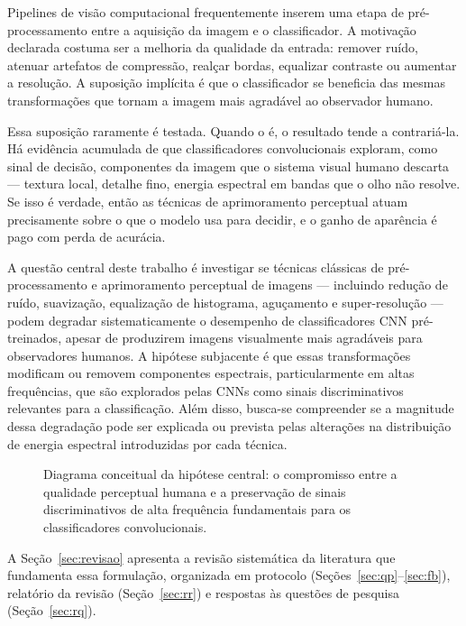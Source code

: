 \documentclass[conference]{IEEEtran}
\begin{document}
Pipelines de visão computacional frequentemente inserem uma etapa de
pré-processamento entre a aquisição da imagem e o classificador. A motivação
declarada costuma ser a melhoria da qualidade da entrada: remover ruído,
atenuar artefatos de compressão, realçar bordas, equalizar contraste ou
aumentar a resolução. A suposição implícita é que o classificador se beneficia
das mesmas transformações que tornam a imagem mais agradável ao observador
humano.

Essa suposição raramente é testada. Quando o é, o resultado tende a
contrariá-la. Há evidência acumulada de que classificadores convolucionais
exploram, como sinal de decisão, componentes da imagem que o sistema visual
humano descarta --- textura local, detalhe fino, energia espectral em bandas
que o olho não resolve. Se isso é verdade, então as técnicas de aprimoramento
perceptual atuam precisamente sobre o que o modelo usa para decidir, e o ganho
de aparência é pago com perda de acurácia.

A questão central deste trabalho é investigar se técnicas clássicas de
pré-processamento e aprimoramento perceptual de imagens --- incluindo redução
de ruído, suavização, equalização de histograma, aguçamento e super-resolução
--- podem degradar sistematicamente o desempenho de classificadores CNN
pré-treinados, apesar de produzirem imagens visualmente mais agradáveis para
observadores humanos. A hipótese subjacente é que essas transformações
modificam ou removem componentes espectrais, particularmente em altas
frequências, que são explorados pelas CNNs como sinais discriminativos
relevantes para a classificação. Além disso, busca-se compreender se a
magnitude dessa degradação pode ser explicada ou prevista pelas alterações na
distribuição de energia espectral introduzidas por cada técnica.

\begin{figure}[htbp]
\centering
\resizebox{\columnwidth}{!}{%
%
}
\caption{Diagrama conceitual da hipótese central: o compromisso entre a qualidade perceptual humana e a preservação de sinais discriminativos de alta frequência fundamentais para os classificadores convolucionais.}
\label{fig:hipotese_conceitual}
\end{figure}

A Seção~\ref{sec:revisao} apresenta a revisão sistemática da literatura que
fundamenta essa formulação, organizada em protocolo
(Seções~\ref{sec:qp}--\ref{sec:fb}), relatório da revisão
(Seção~\ref{sec:rr}) e respostas às questões de pesquisa
(Seção~\ref{sec:rq}).
\end{document}
